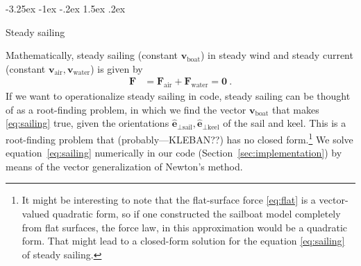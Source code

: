 \documentclass[letterpaper]{article}
\makeatletter
\renewcommand{\vec}[1]{\boldsymbol{#1}}
\newcommand{\uvec}{\vec{\hat{e}}}
\newcommand{\air}{\text{air}}
\newcommand{\water}{\text{water}}
\newcommand{\boat}{\text{boat}}
\newcommand{\sail}{\text{sail}}
\newcommand{\keel}{\text{keel}}
\newcommand{\vair}{\vec{v}_\air}
\newcommand{\vwater}{\vec{v}_\water}
\newcommand{\vboat}{\vec{v}_\boat}
\newcommand{\secref}[1]{Section~\ref{#1}}
\renewcommand\section{\@startsection {section}{1}{\z@}%
  {-3.25ex \@plus -1ex \@minus -.2ex}%
  {1.5ex \@plus .2ex}%
  {\raggedright\normalfont\large\bfseries}}
\makeatother
\begin{document}
\section{Steady sailing}\label{sec:steady}

Mathematically, steady sailing (constant $\vboat$) in steady wind and steady current (constant $\vair, \vwater$) is given by
\begin{align}\label{eq:sailing}
    \vec{F} &= \vec{F}_\air + \vec{F}_\water = \vec{0} ~.
\end{align}
If we want to operationalize steady sailing in code, steady sailing can be thought of as a root-finding problem, in which we find the vector $\vboat$ that makes \eqref{eq:sailing} true, given the orientations $\uvec_{\perp\sail}, \uvec_{\perp\keel}$ of the sail and keel.
This is a root-finding problem that (probably---KLEBAN??) has no closed form.\footnote{%
It might be interesting to note that the flat-surface force \eqref{eq:flat} is a vector-valued quadratic form, so if one constructed the sailboat model completely from flat surfaces, the force law, in this approximation would be a quadratic form.
That might lead to a closed-form solution for the equation \eqref{eq:sailing} of steady sailing.}
We solve equation~\eqref{eq:sailing} numerically in our code (\secref{sec:implementation})
by means of the vector generalization of Newton's method.
\end{document}
